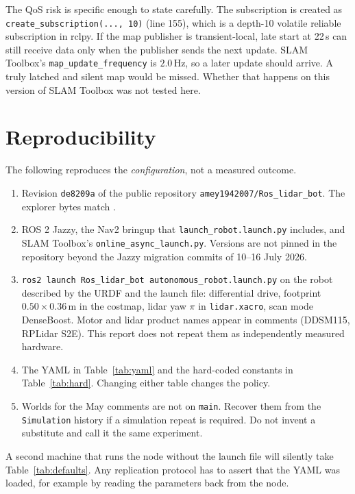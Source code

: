\documentclass[11pt]{article}
\begin{document}
The QoS risk is specific enough to state carefully. The subscription is created as \texttt{create\_subscription(..., 10)} (line 155), which is a depth-10 volatile reliable subscription in rclpy. If the map publisher is transient-local, late start at 22\,s can still receive data only when the publisher sends the next update. SLAM Toolbox's \texttt{map\_update\_frequency} is $2.0$\,Hz, so a later update should arrive. A truly latched and silent map would be missed. Whether that happens on this version of SLAM Toolbox was not tested here.

\section{Reproducibility}
The following reproduces the \emph{configuration}, not a measured outcome.

\begin{enumerate}
\item Revision \texttt{de8209a} of the public repository \texttt{amey1942007/Ros\_lidar\_bot}. The explorer bytes match .
\item ROS 2 Jazzy, the Nav2 bringup that \texttt{launch\_robot.launch.py} includes, and SLAM Toolbox's \texttt{online\_async\_launch.py}. Versions are not pinned in the repository beyond the Jazzy migration commits of 10--16 July 2026.
\item \texttt{ros2 launch Ros\_lidar\_bot autonomous\_robot.launch.py} on the robot described by the URDF and the launch file: differential drive, footprint $0.50\times 0.36$\,m in the costmap, lidar yaw $\pi$ in \texttt{lidar.xacro}, scan mode DenseBoost. Motor and lidar product names appear in comments (DDSM115, RPLidar S2E). This report does not repeat them as independently measured hardware.
\item The YAML in Table~\ref{tab:yaml} and the hard-coded constants in Table~\ref{tab:hard}. Changing either table changes the policy.
\item Worlds for the May comments are not on \texttt{main}. Recover them from the \texttt{Simulation} history if a simulation repeat is required. Do not invent a substitute and call it the same experiment.
\end{enumerate}

A second machine that runs the node without the launch file will silently take Table~\ref{tab:defaults}. Any replication protocol has to assert that the YAML was loaded, for example by reading the parameters back from the node.
\end{document}
